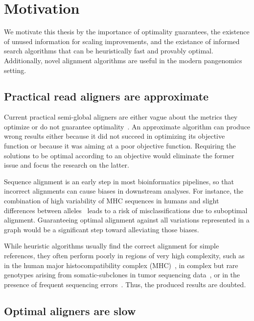 \section*{Motivation}

We motivate this thesis by the importance of optimality guarantees, the
existence of unused information for scaling improvements, and the existance of
informed search algorithms that can be heuristically fast and provably optimal.
Additionally, novel alignment algorithms are useful in the modern pangenomics
setting.

\subsection*{Practical read aligners are approximate}

Current practical semi-global aligners are either vague about the metrics they
optimize or do not guarantee optimality~\cite{alser2021technology}. An
approximate algorithm can produce wrong results either because it did not
succeed in optimizing its objective function or because it was aiming at a poor
objective function. Requiring the solutions to be optimal according to an
objective would eliminate the former issue and focus the research on the
latter.

Sequence alignment is an early step in most bioinformatics pipelines, so that
incorrect alignments can cause biases in downstream analyses. For instance, the
combination of high variability of MHC sequences in humans and slight
differences between alleles~\cite{buhler_hla_2011} leads to a risk of
misclassifications due to suboptimal alignment. Guaranteeing optimal alignment
against all variations represented in a graph would be a significant step
toward alleviating those biases.

While heuristic algorithms usually find the correct alignment for simple
references, they often perform poorly in regions of very high complexity, such
as in the human major histocompatibility complex
(MHC)~\cite{dilthey_improved_2015}, in complex but rare genotypes arising from
somatic-subclones in tumor sequencing data~\cite{harismendy_detection_2011}, or
in the presence of frequent sequencing errors~\cite{salmela_lordec_2014}. Thus,
the produced results are doubted.

\subsection*{Optimal aligners are slow}

